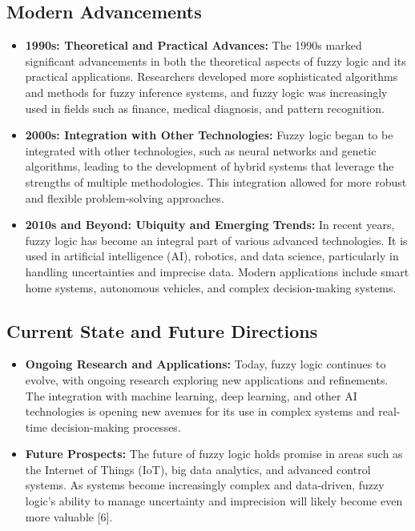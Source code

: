 \documentclass[12pt,a4paper]{article}
\begin{document}
\subsection*{Modern Advancements}
\begin{itemize}

\item \textbf{1990s: Theoretical and Practical Advances:} The 1990s marked significant advancements in both the theoretical aspects of fuzzy logic and its practical applications. Researchers developed more sophisticated algorithms and methods for fuzzy inference systems, and fuzzy logic was increasingly used in fields such as finance, medical diagnosis, and pattern recognition.
\item \textbf{2000s: Integration with Other Technologies:} Fuzzy logic began to be integrated with other technologies, such as neural networks and genetic algorithms, leading to the development of hybrid systems that leverage the strengths of multiple methodologies. This integration allowed for more robust and flexible problem-solving approaches.
\item \textbf{2010s and Beyond: Ubiquity and Emerging Trends:} In recent years, fuzzy logic has become an integral part of various advanced technologies. It is used in artificial intelligence (AI), robotics, and data science, particularly in handling uncertainties and imprecise data. Modern applications include smart home systems, autonomous vehicles, and complex decision-making systems.
\end{itemize}

\subsection*{Current State and Future Directions}
\begin{itemize}

\item \textbf{Ongoing Research and Applications:} Today, fuzzy logic continues to evolve, with ongoing research exploring new applications and refinements. The integration with machine learning, deep learning, and other AI technologies is opening new avenues for its use in complex systems and real-time decision-making processes.
\item \textbf{Future Prospects:} The future of fuzzy logic holds promise in areas such as the Internet of Things (IoT), big data analytics, and advanced control systems. As systems become increasingly complex and data-driven, fuzzy logic's ability to manage uncertainty and imprecision will likely become even more valuable [6].

\end{itemize}
\end{document}
